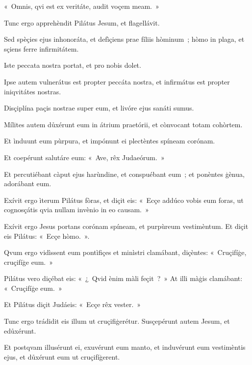 «~Omnis, qvi est ex veritáte, audit voçem meam.~»

Tunc ergo apprehèndit Pilátus Jesum, et flagellávit.

Sed spèçies ejus inhonoráta, et defìçiens prae fíliis hòminum~; hòmo in plaga, et sçiens ferre infirmitátem.

Iste peccata nostra portat, et pro nobis dolet.

Ipse autem vulnerátus est propter peccáta nostra, et infirmátus est propter iniqvitátes nostras.

Disçiplína paçis nostrae super eum, et livóre ejus sanáti sumus.


Mílites autem důxérunt eum in átrium praetórii, et cònvocant totam cohòrtem.

Et ìnduunt eum pùrpura, et impónunt ei plectèntes spíneam corónam.

Et coepérunt salutáre eum: «~Ave, rêx Judaeórum.~»

Et percutiébant càput ejus harùndine, et conspuébant eum~; et ponèntes ģènua, adorábant eum.

Exívit ergo ìterum Pilátus fòras, et diçit eis: «~Ecçe addúco vobis eum foras, ut cognosçátis qvia nullam invènio in eo causam.~»

Exívit ergo Jesus portans corónam spíneam, et purpùreum vestimèntum. Et diçit eis Pilátus: «~Ecçe hòmo.~».

Qvum ergo vidìssent eum pontìfiçes et minìstri clamábant, diçèntes: «~Cruçifíģe, cruçifíģe eum.~»

Pilátus vero diçébat eis: «~¿~Qvid ènim màli feçit~?~» At illi màģis clamábant: «~Cruçifíģe eum.~»

Et Pilátus diçit Judáeis: «~Ecçe rêx vester.~»

Tunc ergo trádidit eis illum ut cruçifiģerétur. Susçepérunt autem Jesum, et edůxérunt.


Et postqvam illusérunt ei, exuvérunt eum manto, et induvérunt eum vestimèntis ejus, et důxérunt eum ut cruçifíģerent.


